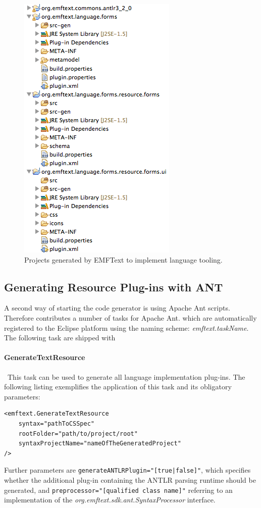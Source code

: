 	\begin{figure}[ht]
	\centering
		\includegraphics[scale=0.7]{figures/generationResults}
	\caption{Projects generated by EMFText to implement language tooling.}
	\label{fig:wizard}
	\end{figure}

	\subsection{Generating Resource Plug-ins with ANT}
	\label{sec:process_generating_ant}
	A second way of starting the \EMFText code generator is using Apache Ant
	scripts. Therefore \EMFText contributes a number of tasks for Apache Ant.
	which are automatically registered to the Eclipse platform using the
	naming scheme: \emph{emftext.taskName}. The following task are shipped with
	
	\paragraph*{GenerateTextResource}~This task can be used to generate all
	language implementation plug-ins. The following listing exemplifies the
	application of this task and its obligatory parameters:
\begin{lstlisting}
<emftext.GenerateTextResource
	syntax="pathToCSSpec"
	rootFolder="path/to/project/root"
	syntaxProjectName="nameOfTheGeneratedProject"
/>
\end{lstlisting}
	Further parameters are \texttt{generateANTLRPlugin="[true|false]"}, which
	specifies whether the additional plug-in
	containing the ANTLR parsing runtime should be generated, and
	\texttt{pre\-processor="[qualified class name]"} referring to an implementation
	of the \emph{org.emftext.sdk.\-ant.Syntax\-Processor} interface. 
	
